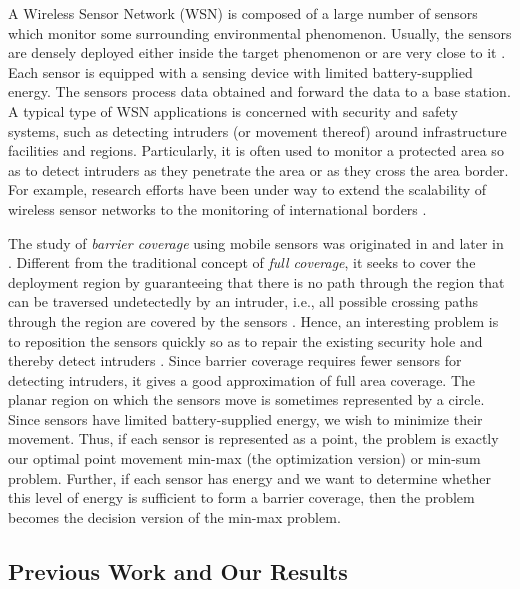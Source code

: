 \documentclass[11pt]{article}
\begin{document}
A Wireless Sensor Network (WSN) is composed of a large number of
sensors which monitor some surrounding environmental phenomenon.
Usually, the sensors are densely deployed either inside the target phenomenon or
are very close to it \cite{ref:AkyildizWi02}. Each sensor
is equipped with a sensing device
with limited battery-supplied energy.
The sensors process data obtained and forward the data to a base station.
A typical type of WSN applications
is concerned with security and safety systems, such as detecting intruders
(or movement thereof) around infrastructure facilities and regions. Particularly,
it is often used to monitor a protected area so as to detect intruders
as they penetrate the area or as they cross the area border. For example, research
efforts have been under way to extend the scalability of wireless sensor networks
to the monitoring of international borders \cite{ref:Hu08,ref:KumarBa07}.

The study of {\it barrier coverage} using mobile sensors was originated
in \cite{ref:ChenDe07,ref:KumarBa07} and later in \cite{ref:BhattacharyaOp09}.
Different from the traditional concept of {\it full coverage},
it seeks to cover the deployment region by guaranteeing that there is no
path through the region that can be traversed undetectedly by an intruder,
i.e., all possible crossing paths through the region
are covered by the sensors \cite{ref:BhattacharyaOp09,ref:ChenDe07,ref:KumarBa07}.
Hence, an interesting problem is
to reposition the sensors quickly so as to repair the existing security hole and
thereby detect intruders \cite{ref:BhattacharyaOp09}. Since barrier coverage
requires fewer sensors for detecting intruders, it gives a good
approximation of full area coverage. The planar region on which the sensors move
is sometimes represented by a circle.
Since sensors have limited battery-supplied energy, we wish
to minimize their movement. Thus, if each sensor is
represented as a point, the problem is exactly our optimal point
movement min-max (the optimization version) or min-sum problem.
Further, if each sensor has energy  and we want to determine
whether this level of energy is sufficient to form a barrier coverage,
then the problem becomes the decision version of the min-max problem.





\subsection{Previous Work and Our Results}
\end{document}

